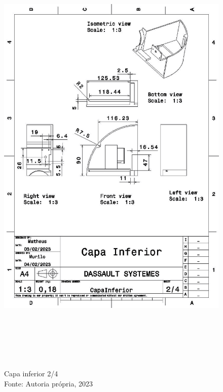 \newpage
\pagebreak
\begin{figure}[h!]
\centering
\includegraphics[width=16cm,height=22cm]{figuras/CapaInferior2_4.jpg}
\caption{Capa inferior 2/4\\Fonte: Autoria própria, 2023}
\label{CapaInferior2_4}
\end{figure}

